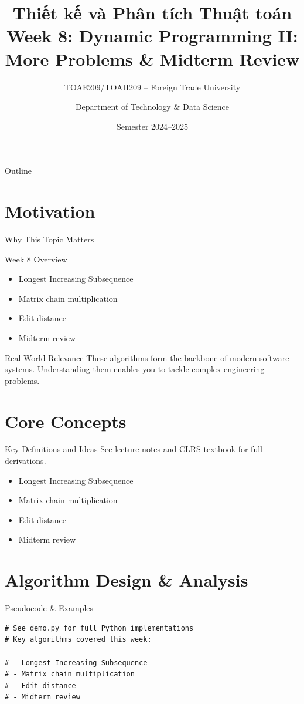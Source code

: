 \documentclass[aspectratio=169,xcolor=dvipsnames]{beamer}
\title[Algorithms -- Week 8]{\textbf{Thiết kế và Phân tích Thuật toán}\\
  \large Week 8: Dynamic Programming II: More Problems & Midterm Review}
\subtitle{TOAE209/TOAH209 -- Foreign Trade University}
\author{Department of Technology \& Data Science}
\date{Semester 2024--2025}
\begin{document}
\begin{frame}\titlepage\end{frame}
\begin{frame}{Outline}\tableofcontents\end{frame}

\section{Motivation}
\begin{frame}{Why This Topic Matters}
  \begin{block}{Week 8 Overview}
    \begin{itemize}
    \item Longest Increasing Subsequence
    \item Matrix chain multiplication
    \item Edit distance
    \item Midterm review
    \end{itemize}
  \end{block}
  \begin{exampleblock}{Real-World Relevance}
    These algorithms form the backbone of modern software systems.
    Understanding them enables you to tackle complex engineering problems.
  \end{exampleblock}
\end{frame}

\section{Core Concepts}
\begin{frame}{Key Definitions and Ideas}
  See lecture notes and CLRS textbook for full derivations.
  \begin{itemize}
    \item Longest Increasing Subsequence
    \item Matrix chain multiplication
    \item Edit distance
    \item Midterm review
  \end{itemize}
\end{frame}

\section{Algorithm Design \& Analysis}
\begin{frame}[fragile]{Pseudocode \& Examples}
  \begin{lstlisting}
# See demo.py for full Python implementations
# Key algorithms covered this week:

# - Longest Increasing Subsequence
# - Matrix chain multiplication
# - Edit distance
# - Midterm review
  \end{lstlisting}
\end{frame}
\end{document}
